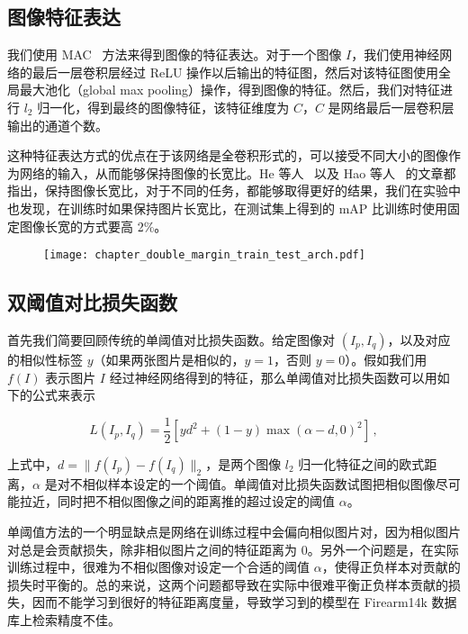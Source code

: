 \subsection{图像特征表达}

我们使用 MAC~\cite{Tolias2015ParticularOR} 方法来得到图像的特征表达。对于一个图像 $I$，我们使用神经网络的最后一层卷积层经过 ReLU 操作以后输出的特征图，然后对该特征图使用全局最大池化（global max pooling）操作，得到图像的特征。然后，我们对特征进行 $l_2$ 归一化，得到最终的图像特征，该特征维度为 $C$，$C$ 是网络最后一层卷积层输出的通道个数。

这种特征表达方式的优点在于该网络是全卷积形式的，可以接受不同大小的图像作为网络的输入，从而能够保持图像的长宽比。He 等人~\cite{He2014SpatialPP} 以及 Hao 等人~\cite{Hao2017MFCAM} 的文章都指出，保持图像长宽比，对于不同的任务，都能够取得更好的结果，我们在实验中也发现，在训练时如果保持图片长宽比，在测试集上得到的 mAP 比训练时使用固定图像长宽的方式要高 2\%。

\begin{figure}[!t]
  \centering
  \texttt{[image: chapter\_double\_margin\_train\_test\_arch.pdf]}
  \label{fig:train_test_arch}
\end{figure}

\subsection{双阈值对比损失函数}
首先我们简要回顾传统的单阈值对比损失函数。给定图像对 $(I_p, I_q)$，以及对应的相似性标签 $y$（如果两张图片是相似的，$y=1$，否则 $y=0$）。假如我们用 $f(I)$ 表示图片 $I$ 经过神经网络得到的特征，那么单阈值对比损失函数可以用如下的公式来表示

\begin{equation}\label{eq:single_margin_loss}
L(I_p, I_q) = \frac{1}{2}\left[yd^2 + (1-y)\max(\alpha - d, 0)^2\right]\, ,
\end{equation}

\noindent 上式中，$d= \lVert f(I_p)-f(I_q)\rVert_2$，是两个图像 $l_2$ 归一化特征之间的欧式距离，$\alpha$ 是对不相似样本设定的一个阈值。单阈值对比损失函数试图把相似图像尽可能拉近，同时把不相似图像之间的距离推的超过设定的阈值 $\alpha$。

单阈值方法的一个明显缺点是网络在训练过程中会偏向相似图片对，因为相似图片对总是会贡献损失，除非相似图片之间的特征距离为 0。另外一个问题是，在实际训练过程中，很难为不相似图像对设定一个合适的阈值 $\alpha$，使得正负样本对贡献的损失时平衡的。总的来说，这两个问题都导致在实际中很难平衡正负样本贡献的损失，因而不能学习到很好的特征距离度量，导致学习到的模型在 Firearm14k 数据库上检索精度不佳。


